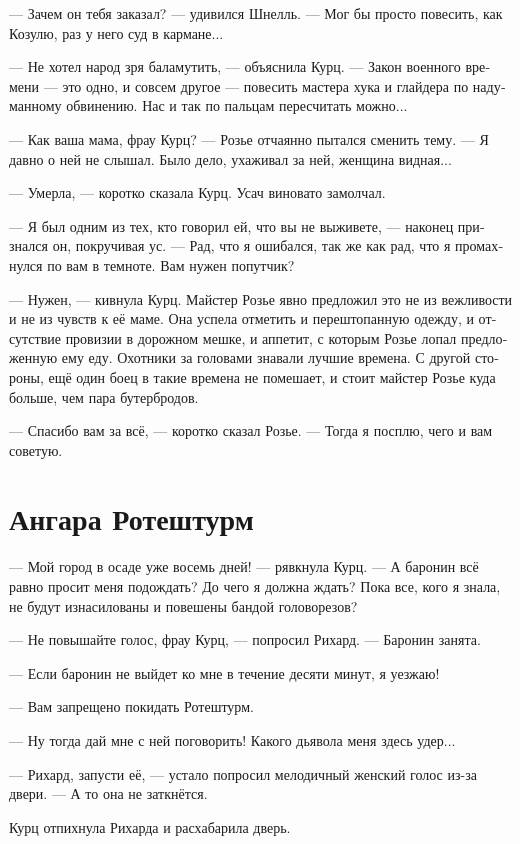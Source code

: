 \documentclass[a4paper,12pt,fleqn]{book}\usepackage{cooltooltips}\usepackage{polyglossia}\setdefaultlanguage[babelshorthands=true]{russian}\setotherlanguage{english}\defaultfontfeatures{Ligatures=TeX,Mapping=tex-text} \usepackage{xcolor}\definecolor{lightgray}{HTML}{bbbbbb}\color{lightgray}\newcommand{\ml}[3]{\textenglish{\textcolor{black}{#3}}}
\begin{document}
--- Зачем он тебя заказал? --- удивился Шнелль.
--- Мог бы просто повесить, как Козулю, раз у него суд в кармане...

--- Не хотел народ зря баламутить, --- объяснила Курц.
--- Закон военного времени --- это одно, и совсем другое --- повесить мастера хука и глайдера по надуманному обвинению.
Нас и так по пальцам пересчитать можно...

--- Как ваша мама, фрау Курц? --- Розье отчаянно пытался сменить тему.
--- Я давно о ней не слышал.
Было дело, ухаживал за ней, женщина видная...

--- Умерла, --- коротко сказала Курц.
Усач виновато замолчал.

--- Я был одним из тех, кто говорил ей, что вы не выживете, --- наконец признался он, покручивая ус.
--- Рад, что я ошибался, так же как рад, что я промахнулся по вам в темноте.
Вам нужен попутчик?

--- Нужен, --- кивнула Курц.
Майстер Розье явно предложил это не из вежливости и не из чувств к её маме.
Она успела отметить и перештопанную одежду, и отсутствие провизии в дорожном мешке, и аппетит, с которым Розье лопал предложенную ему еду.
Охотники за головами знавали лучшие времена.
С другой стороны, ещё один боец в такие времена не помешает, и стоит майстер Розье куда больше, чем пара бутербродов.

--- Спасибо вам за всё, --- коротко сказал Розье.
--- Тогда я посплю, чего и вам советую.

\section{Ангара Ротештурм}

--- Мой город в осаде уже восемь дней! --- рявкнула Курц.
--- А баронин всё равно просит меня подождать?
До чего я должна ждать?
Пока все, кого я знала, не будут изнасилованы и повешены бандой головорезов?

--- Не повышайте голос, фрау Курц, --- попросил Рихард.
--- Баронин занята. 

--- Если баронин не выйдет ко мне в течение десяти минут, я уезжаю!

--- Вам запрещено покидать Ротештурм.

--- Ну тогда дай мне с ней поговорить!
Какого дьявола меня здесь удер...

--- Рихард, запусти её, --- устало попросил мелодичный женский голос из-за двери.
--- А то она не заткнётся.

Курц отпихнула Рихарда и расхабарила дверь.
\end{document}
